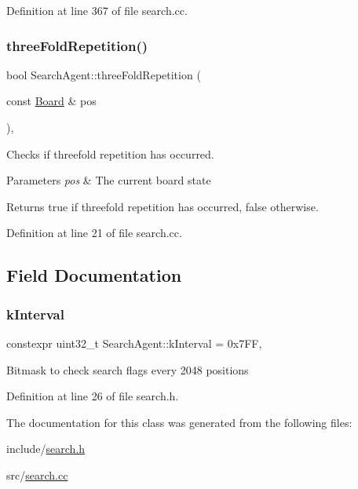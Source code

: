 Definition at line 367 of file search.\+cc.

\mbox{\label{classSearchAgent_acaf7ae2df02a071a23e6db4fbbdc7d99}} 
\subsubsection{\texorpdfstring{three\+Fold\+Repetition()}{threeFoldRepetition()}}
{\footnotesize\ttfamily bool Search\+Agent\+::three\+Fold\+Repetition (\begin{DoxyParamCaption}\item[{const \mbox{\hyperlink{classBoard}{Board}} \&}]{pos }\end{DoxyParamCaption})\hspace{0.3cm}{\ttfamily [private]}, {\ttfamily [noexcept]}}



Checks if threefold repetition has occurred. 


\begin{DoxyParams}{Parameters}
{\em pos} & The current board state \\
\hline
\end{DoxyParams}
\begin{DoxyReturn}{Returns}
true if threefold repetition has occurred, false otherwise. 
\end{DoxyReturn}


Definition at line 21 of file search.\+cc.



\subsection{Field Documentation}
\mbox{\label{classSearchAgent_ac040d91cab3fb103bce31d669d2bba47}} 
\subsubsection{\texorpdfstring{k\+Interval}{kInterval}}
{\footnotesize\ttfamily constexpr uint32\+\_\+t Search\+Agent\+::k\+Interval = 0x7\+FF\hspace{0.3cm}{\ttfamily [static]}, {\ttfamily [private]}}

Bitmask to check search flags every 2048 positions 

Definition at line 26 of file search.\+h.



The documentation for this class was generated from the following files\+:\begin{DoxyCompactItemize}
\item 
include/\mbox{\hyperlink{search_8h}{search.\+h}}\item 
src/\mbox{\hyperlink{search_8cc}{search.\+cc}}\end{DoxyCompactItemize}
